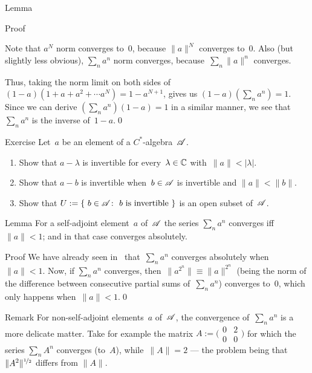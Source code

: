 \documentclass[a]{subfiles}
\begin{document}
\begin{parsec}
\begin{point}[geometric]{Lemma}
\begin{point}{Proof}
\begin{point}%
Note that $a^N$ norm converges to~$0$,
because $\|a\|^N$ converges to~$0$.
Also (but slightly less obvious),
$\sum_n a^n$ norm converges,
because~$\sum_n \|a\|^n$ converges.
\end{point}
\begin{point}%
Thus, taking the norm limit
on both sides of $(1-a)(1+a+a^2+\dotsb a^N) = 1-a^{N+1}$,
gives us $(1-a)(\sum_n a^n) = 1$.
Since we can derive $(\sum_n a^n)(1-a) = 1$
in a similar manner, 
we see that $\sum_n a^n$ is the inverse of~$1-a$.\qed
\end{point}
\end{point}
\end{point}
\begin{point}{Exercise}
Let~$a$ be an element of a $C^*$-algebra~$\mathscr{A}$.
\begin{enumerate}
\item
Show that $a-\lambda$ is invertible
for every~$\lambda\in\mathbb{C}$ with~$\|a\|< \left|\lambda\right|$.
\item
Show that $a-b$ is invertible
when~$b\in\mathscr{A}$ is invertible and $\|a\| < \|b\|$.
\item
Show that $U:=\{\ b\in\scrA\colon\ \text{$b$ is invertible}\ \}$
is an open subset of~$\mathscr{A}$.
\end{enumerate}
\end{point}
\begin{point}{Lemma}%
For a self-adjoint element~$a$ of~$\mathscr{A}$
the series $\sum_n a^n$ 
converges iff~$\|a\|<1$;
and in that case converges absolutely.
\begin{point}{Proof}%
We have already seen in~
that~$\sum_n a^n$
converges absolutely when~$\|a\|<1$.
Now, if $\sum_n a^n$ converges,
then~$\|a^{2^n}\|\equiv \|a\|^{2^n}$
(being the norm of the difference
between consecutive partial sums of~$\sum_n a^n$)
converges to~$0$,
which only happens when~$\|a\|<1$.\qed
\end{point}
\begin{point}{Remark}%
For non-self-adjoint elements~$a$ of~$\mathscr{A}$,
the convergence of~$\sum_n a^n$
is a more delicate matter.
Take for example
the matrix $A:=\bigl(\begin{smallmatrix}0&2\\0&0\end{smallmatrix}\bigr)$
for which the series $\sum_n A^n$ converges (to~$A$),
while~$\|A\|=2$ --- the problem being that
$\|A^2\|^{\nicefrac{1}{2}}$ differs from $\|A\|$.

\end{point}
\end{point}
\end{parsec}
\end{document}
